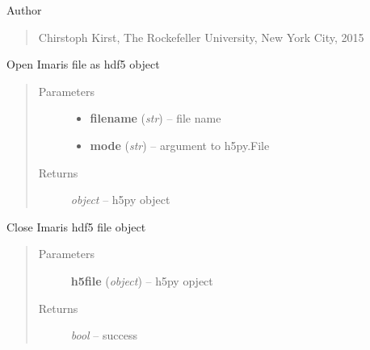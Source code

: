 \documentclass[letterpaper,10pt,english]{sphinxmanual}
\begin{document}
Author
\begin{quote}

Chirstoph Kirst, The Rockefeller University, New York City, 2015
\end{quote}

\begin{fulllineitems}
\label{api/ClearMap.IO:ClearMap.IO.Imaris.openFile}
Open Imaris file as hdf5 object
\begin{quote}\begin{description}
\item[{Parameters}] \leavevmode\begin{itemize}
\item {} 
\textbf{filename} (\emph{str}) --
file name

\item {} 
\textbf{mode} (\emph{str}) --
argument to h5py.File

\end{itemize}

\item[{Returns}] \leavevmode
\emph{object} --
h5py object

\end{description}\end{quote}

\end{fulllineitems}


\begin{fulllineitems}
\label{api/ClearMap.IO:ClearMap.IO.Imaris.closeFile}
Close Imaris hdf5 file object
\begin{quote}\begin{description}
\item[{Parameters}] \leavevmode
\textbf{h5file} (\emph{object}) --
h5py opject

\item[{Returns}] \leavevmode
\emph{bool} --
success

\end{description}\end{quote}

\end{fulllineitems}

\end{document}
